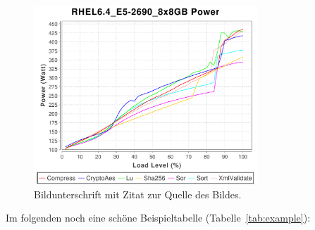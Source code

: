 \documentclass[runningheads,a4paper]{uwsese}
\begin{document}
\begin{figure}[t]
\begin{center}
\includegraphics[trim=0cm 0cm 0cm 1cm, clip=true,width = 8.4cm]{graphics/RHEL6_4_E5-2690_8x8GB_p_truex50.pdf}
\caption{Bildunterschrift mit Zitat zur Quelle des Bildes.}
\label{fig:example}
\end{center}
\end{figure}

Im folgenden noch eine schöne Beispieltabelle (Tabelle~\ref{tab:example}):
\end{document}
